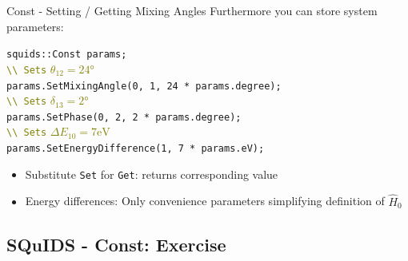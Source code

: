 \documentclass[]{beamer}
\begin{document}
\begin{frame}{Const -  Setting / Getting Mixing Angles}
  Furthermore you can store system parameters:
  \begin{tcolorbox}[colback=gray!5!white]
    \texttt{squids::Const params;} \\
    \textcolor{olive}{\texttt{\textbackslash \textbackslash {} Sets} \(\theta_{12} = 24\)°} \\
    \texttt{params.SetMixingAngle(0, 1, 24 * params.degree);} \\
    \textcolor{olive}{\texttt{\textbackslash \textbackslash {} Sets} \(\delta_{13} = 2\)°} \\
    \texttt{params.SetPhase(0, 2, 2 * params.degree);} \\
    \textcolor{olive}{\texttt{\textbackslash \textbackslash {} Sets} \(\Delta E_{10} = 7 \mathrm{eV}\)} \\
    \texttt{params.SetEnergyDifference(1, 7 * params.eV);}
  \end{tcolorbox}
  \begin{itemize}
    \item Substitute \texttt{Set} for \texttt{Get}: returns corresponding value
    \item Energy differences: Only convenience parameters simplifying definition of \(\hat{H}_0\)
  \end{itemize}
\end{frame}

\subsection{SQuIDS - Const: Exercise}

\begin{frame}
\end{frame}
\end{document}
